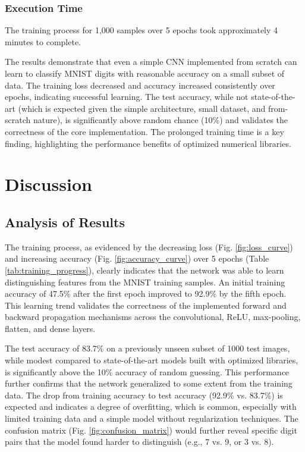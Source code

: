\documentclass[conference]{IEEEtran}
\begin{document}
\subsubsection{Execution Time}
The training process for 1,000 samples over 5 epochs took approximately 4 minutes to complete. 

The results demonstrate that even a simple CNN implemented from scratch can learn to classify MNIST digits with reasonable accuracy on a small subset of data. The training loss decreased and accuracy increased consistently over epochs, indicating successful learning. The test accuracy, while not state-of-the-art (which is expected given the simple architecture, small dataset, and from-scratch nature), is significantly above random chance (10\%) and validates the correctness of the core implementation. The prolonged training time is a key finding, highlighting the performance benefits of optimized numerical libraries.

\section{Discussion}
\subsection{Analysis of Results}
The training process, as evidenced by the decreasing loss (Fig. \ref{fig:loss_curve}) and increasing accuracy (Fig. \ref{fig:accuracy_curve}) over 5 epochs (Table \ref{tab:training_progress}), clearly indicates that the network was able to learn distinguishing features from the MNIST training samples. An initial training accuracy of 47.5\% after the first epoch improved to 92.9\% by the fifth epoch. This learning trend validates the correctness of the implemented forward and backward propagation mechanisms across the convolutional, ReLU, max-pooling, flatten, and dense layers.

The test accuracy of 83.7\% on a previously unseen subset of 1000 test images, while modest compared to state-of-the-art models built with optimized libraries, is significantly above the 10\% accuracy of random guessing. This performance further confirms that the network generalized to some extent from the training data. The drop from training accuracy to test accuracy (92.9\% vs. 83.7\%) is expected and indicates a degree of overfitting, which is common, especially with limited training data and a simple model without regularization techniques. The confusion matrix (Fig. \ref{fig:confusion_matrix}) would further reveal specific digit pairs that the model found harder to distinguish (e.g., 7 vs. 9, or 3 vs. 8).
\end{document}
